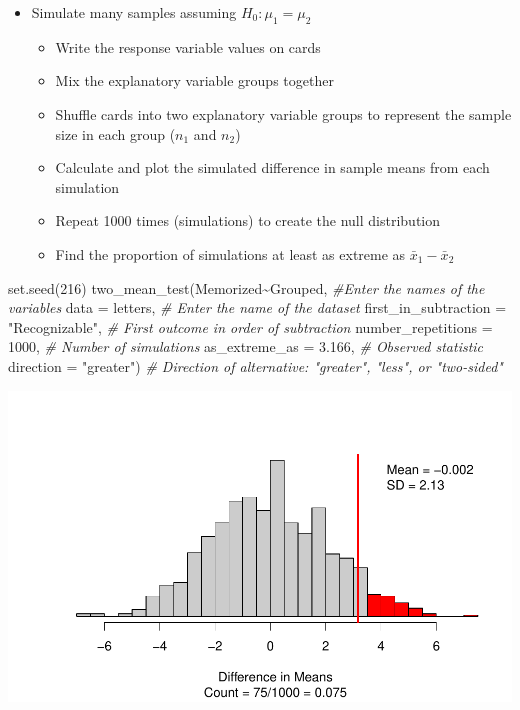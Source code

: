 \documentclass[
]{report}
\newenvironment{Shaded}{\begin{snugshade}}{\end{snugshade}}
\newcommand{\AttributeTok}[1]{\textcolor[rgb]{0.77,0.63,0.00}{#1}}
\newcommand{\CommentTok}[1]{\textcolor[rgb]{0.56,0.35,0.01}{\textit{#1}}}
\newcommand{\DecValTok}[1]{\textcolor[rgb]{0.00,0.00,0.81}{#1}}
\newcommand{\FloatTok}[1]{\textcolor[rgb]{0.00,0.00,0.81}{#1}}
\newcommand{\FunctionTok}[1]{\textcolor[rgb]{0.00,0.00,0.00}{#1}}
\newcommand{\NormalTok}[1]{#1}
\newcommand{\SpecialCharTok}[1]{\textcolor[rgb]{0.00,0.00,0.00}{#1}}
\newcommand{\StringTok}[1]{\textcolor[rgb]{0.31,0.60,0.02}{#1}}
\begin{document}
\begin{itemize}
\item
  Simulate many samples assuming \(H_0: \mu_1 = \mu_2\)

  \begin{itemize}
  \item
    Write the response variable values on cards
  \item
    Mix the explanatory variable groups together
  \item
    Shuffle cards into two explanatory variable groups to represent the sample size in each group (\(n_1\) and \(n_2\))
  \item
    Calculate and plot the simulated difference in sample means from each simulation
  \item
    Repeat 1000 times (simulations) to create the null distribution
  \item
    Find the proportion of simulations at least as extreme as \(\bar{x}_1 - \bar{x}_2\)
  \end{itemize}
\end{itemize}

\begin{Shaded}
\begin{Highlighting}[]
\FunctionTok{set.seed}\NormalTok{(}\DecValTok{216}\NormalTok{)}
\FunctionTok{two\_mean\_test}\NormalTok{(Memorized}\SpecialCharTok{\textasciitilde{}}\NormalTok{Grouped, }\CommentTok{\#Enter the names of the variables}
              \AttributeTok{data =}\NormalTok{ letters,  }\CommentTok{\# Enter the name of the dataset}
              \AttributeTok{first\_in\_subtraction =} \StringTok{"Recognizable"}\NormalTok{, }\CommentTok{\# First outcome in order of subtraction}
              \AttributeTok{number\_repetitions =} \DecValTok{1000}\NormalTok{,  }\CommentTok{\# Number of simulations}
              \AttributeTok{as\_extreme\_as =} \FloatTok{3.166}\NormalTok{,  }\CommentTok{\# Observed statistic}
              \AttributeTok{direction =} \StringTok{"greater"}\NormalTok{)  }\CommentTok{\# Direction of alternative: "greater", "less", or "two{-}sided"}
\end{Highlighting}
\end{Shaded}

\begin{center}\includegraphics[width=0.7\linewidth]{12-LN012-1ofeach_files/figure-latex/unnamed-chunk-3-1} \end{center}
\end{document}
